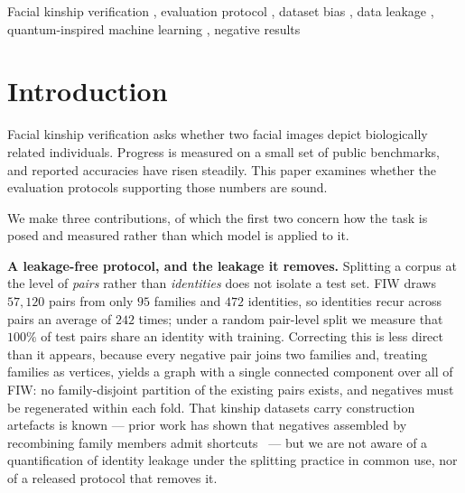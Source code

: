 \documentclass[preprint,12pt]{elsarticle}
\begin{document}
\begin{frontmatter}
\begin{abstract}
substantial bottleneck, so the negative result should be read as scoped to
scalar-readout formulations rather than to quantum-inspired representations in
general. We further show that both findings replicate under a second backbone
(ArcFace), where the person-level gain is larger still ($+0.098$), and we
document a subgroup artefact of independent methodological interest: an
apparent $0.28$ ROC-AUC deficit for mother--son pairs proves to be a
single-family effect that disappears ($0.031$ spread) once no family is allowed
to dominate a fold. All protocol and evaluation code,
together with the JSON artefacts underlying every figure and table, is
released.
\end{abstract}

\begin{keyword}
Facial kinship verification \sep
evaluation protocol \sep
dataset bias \sep
data leakage \sep
quantum-inspired machine learning \sep
negative results
\end{keyword}

\end{frontmatter}

\section{Introduction}

Facial kinship verification asks whether two facial images depict biologically
related individuals. Progress is measured on a small set of public benchmarks,
and reported accuracies have risen steadily. This paper examines whether the
evaluation protocols supporting those numbers are sound.

We make three contributions, of which the first two concern how the task is
posed and measured rather than which model is applied to it.

\textbf{A leakage-free protocol, and the leakage it removes.} Splitting a
corpus at the level of \emph{pairs} rather than \emph{identities} does not
isolate a test set. FIW draws $57{,}120$ pairs from only $95$ families and
$472$ identities, so identities recur across pairs an average of $242$ times;
under a random pair-level split we measure that $100\%$ of test pairs share an
identity with training. Correcting this is less direct than it appears, because
every negative pair joins two families and, treating families as vertices,
yields a graph with a single connected component over all of FIW: no
family-disjoint partition of the existing pairs exists, and negatives must be
regenerated within each fold. That kinship datasets carry construction
artefacts is known --- prior work has shown that negatives assembled by
recombining family members admit shortcuts~\cite{dawson2018samephoto} --- but we are
not aware of a quantification of identity leakage under the splitting practice
in common use, nor of a released protocol that removes it.
\end{document}
